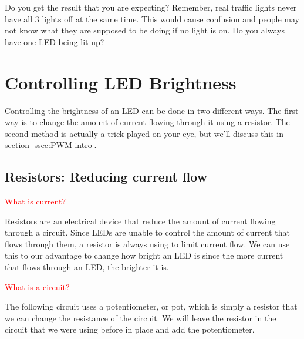 \documentclass[12pt]{article}
\begin{document}
	Do you get the result that you are expecting? Remember, real traffic lights never have all 3 lights off at the same time. This would cause confusion and people may not know what they are supposed to be doing if no light is on. Do you always have one LED being lit up?
	
	
	
	
	\section{Controlling LED Brightness}
	
	Controlling the brightness of an LED can be done in two different ways. The first way is to change the amount of current flowing through it using a resistor. The second method is actually a trick played on your eye, but we'll discuss this in section \ref{ssec:PWM intro}.
	
	\subsection{Resistors: Reducing current flow}
	
	\textcolor{red}{What is current?}
	
	Resistors are an electrical device that reduce the amount of current flowing through a circuit. Since LEDs are unable to control the amount of current that flows through them, a resistor is always using to limit current flow. We can use this to our advantage to change how bright an LED is since the more current that flows through an LED, the brighter it is.
	
	\textcolor{red}{What is a circuit?}
	
	The following circuit uses a potentiometer, or pot, which is simply a resistor that we can change the resistance of the circuit. We will leave the resistor in the circuit that we were using before in place and add the potentiometer.
	
\end{document}
